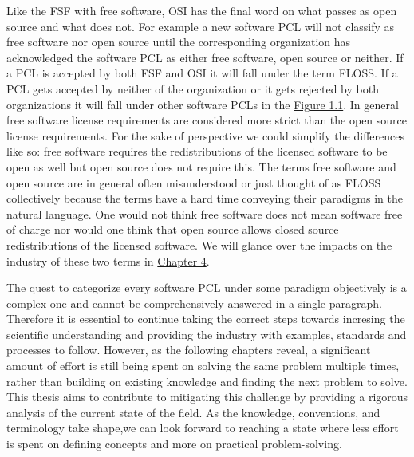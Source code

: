 Like the FSF with free software, OSI has the final word on what passes as open source and what does not. For example a new software PCL will not classify as free software nor open source until the corresponding organization has acknowledged the software PCL as either free software, open source or neither. If a PCL is accepted by both FSF and OSI it will fall under the term FLOSS. If a PCL gets accepted by neither of the organization or it gets rejected by both organizations it will fall under other software PCLs in the \hyperref[fig:terms]{Figure 1.1}. In general free software license requirements are considered more strict than the open source license requirements. For the sake of perspective we could simplify the differences like so: free software requires the redistributions of the licensed software to be open as well but open source does not require this. The terms free software and open source are in general often misunderstood or just thought of as FLOSS collectively because the terms have a hard time conveying their paradigms in the natural language. One would not think free software does not mean software free of charge nor would one think that open source allows closed source redistributions of the licensed software. We will glance over the impacts on the industry of these two terms in \hyperref[discussion]{Chapter 4}.

The quest to categorize every software PCL under some paradigm objectively is a complex one and cannot be comprehensively answered in a single paragraph. Therefore it is essential to continue taking the correct steps towards incresing the scientific understanding and providing the industry with examples, standards and processes to follow. However, as the following chapters reveal, a significant amount of effort is still being spent on solving the same problem multiple times, rather than building on existing knowledge and finding the next problem to solve. This thesis aims to contribute to mitigating this challenge by providing a rigorous analysis of the current state of the field. As the knowledge, conventions, and terminology take shape,we can look forward to reaching a state where less effort is spent on defining concepts and more on practical problem-solving.